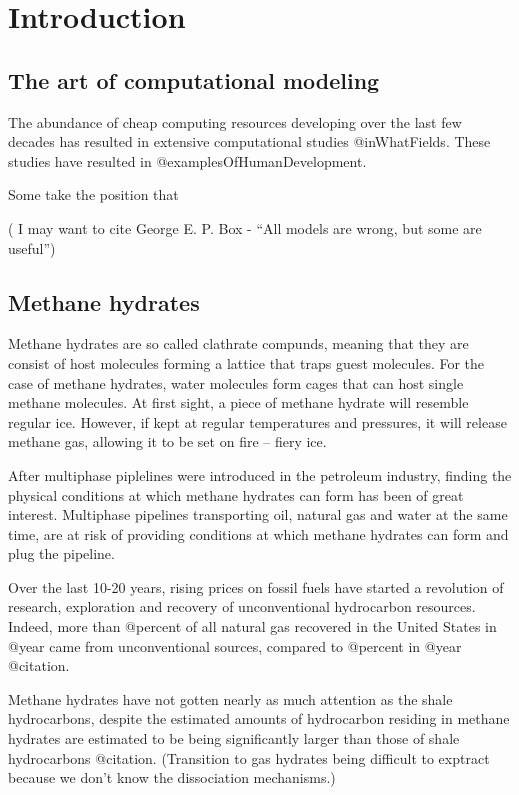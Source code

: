 \chapter{Introduction}
\section{The art of computational modeling}
The abundance of cheap computing resources developing over the last few decades has resulted in extensive computational studies @inWhatFields. These studies have resulted in @examplesOfHumanDevelopment. 

Some take the position that 

( I may want to cite George E. P. Box - ``All models are wrong, but some are useful'')

\section{Methane hydrates}
Methane hydrates are so called clathrate compunds, meaning that they are consist of host molecules forming a lattice that traps guest molecules. For the case of methane hydrates, water molecules form cages that can host single methane molecules. At first sight, a piece of methane hydrate will resemble regular ice. However, if kept at regular temperatures and pressures, it will release methane gas, allowing it to be set on fire -- fiery ice. 

After multiphase piplelines were introduced in the petroleum industry, finding the physical conditions at which methane hydrates can form has been of great interest. Multiphase pipelines transporting oil, natural gas and water at the same time, are at risk of providing conditions at which methane hydrates can form and plug the pipeline. 

Over the last 10-20 years, rising prices on fossil fuels have started a revolution of research, exploration and recovery of unconventional hydrocarbon resources. Indeed, more than @percent of all natural gas recovered in the United States in @year came from unconventional sources, compared to @percent in @year @citation. 

Methane hydrates have not gotten nearly as much attention as the shale hydrocarbons, despite the estimated amounts of hydrocarbon residing in methane hydrates are estimated to be being significantly larger than those of shale hydrocarbons @citation. 
(Transition to gas hydrates being difficult to exptract because we don't know the dissociation mechanisms.)

